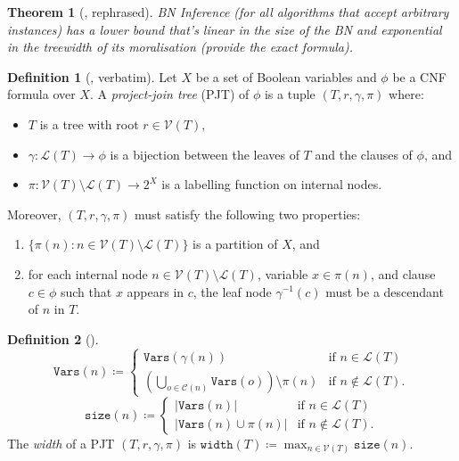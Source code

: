 \documentclass{article}
\newtheorem{theorem}{Theorem}
\theoremstyle{definition}
\newtheorem{definition}{Definition}
\theoremstyle{remark}
\begin{document}
\begin{theorem}[\cite{DBLP:conf/ecai/KwisthoutBG10}, rephrased]
  BN Inference (for all algorithms that accept arbitrary instances) has a lower
  bound that's linear in the size of the BN and exponential in the treewidth of
  its moralisation (provide the exact formula).
\end{theorem}

\begin{definition}[\cite{DBLP:conf/cp/DudekPV20}, verbatim]
  Let $X$ be a set of Boolean variables and $\phi$ be a CNF formula over $X$. A
  \emph{project-join tree} (PJT) of $\phi$ is a tuple $(T, r, \gamma, \pi)$
  where:
  \begin{itemize}
  \item $T$ is a tree with root $r \in \mathcal{V}(T)$,
  \item $\gamma\colon \mathcal{L}(T) \to \phi$ is a bijection between the leaves
    of $T$ and the clauses of $\phi$, and
  \item $\pi\colon \mathcal{V}(T) \setminus \mathcal{L}(T) \to 2^X$ is a
    labelling function on internal nodes.
  \end{itemize}
  Moreover, $(T, r, \gamma, \pi)$ must satisfy the following two properties:
  \begin{enumerate}
  \item $\{\pi(n) : n \in \mathcal{V}(T) \setminus \mathcal{L}(T)\}$ is a
    partition of $X$, and
  \item for each internal node $n \in \mathcal{V}(T) \setminus \mathcal{L}(T)$,
    variable $x \in \pi(n)$, and clause $c \in \phi$ such that $x$ appears in
    $c$, the leaf node $\gamma^{-1}(c)$ must be a descendant of $n$ in $T$.
  \end{enumerate}
\end{definition}

\begin{definition}[\cite{DBLP:conf/cp/DudekPV20}]
  \[
    \mathtt{Vars}(n) \coloneqq
    \begin{cases}
      \mathtt{Vars}(\gamma(n)) & \text{if } n \in \mathcal{L}(T) \\
      \left( \bigcup_{o \in \mathcal{C}(n)} \mathtt{Vars}(o) \right) \setminus
      \pi(n) & \text{if } n \not\in \mathcal{L}(T).
    \end{cases}
  \]
  \[
    \mathtt{size}(n) \coloneqq
    \begin{cases}
      |\mathtt{Vars}(n)| & \text{if } n \in \mathcal{L}(T) \\
      |\mathtt{Vars}(n) \cup \pi(n)| & \text{if } n \not\in \mathcal{L}(T).
    \end{cases}
  \]
  The \emph{width} of a PJT $(T, r, \gamma, \pi)$ is
  $\mathtt{width}(T) \coloneqq \max_{n \in \mathcal{V}(T)} \mathtt{size}(n)$.
\end{definition}
\end{document}
